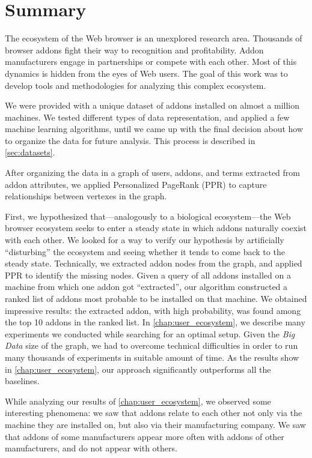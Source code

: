 \documentclass[11pt,oneside]{book}
\begin{document}
\chapter{Summary}
\label{chap:summary}
The ecosystem of the Web browser is an unexplored research area. Thousands of browser addons fight their way to recognition and profitability. Addon manufacturers engage in partnerships or compete with each other. Most of this dynamics is hidden from the eyes of Web users. The goal of this work was to develop tools and methodologies for analyzing this complex ecosystem.

We were provided with a unique dataset of addons installed on almost a million machines. We tested different types of data representation, and applied a few machine learning algorithms, until we came up with the final decision about how to organize the data for future analysis. This process is described in \autoref{sec:datasets}.

After organizing the data in a graph of users, addons, and terms extracted from addon attributes, we applied Personalized PageRank (PPR) to capture relationships between vertexes in the graph.

First, we hypothesized that---analogously to a biological ecosystem---the Web browser ecosystem seeks to enter a steady state in which addons naturally coexist with each other. We looked for a way to verify our hypothesis by artificially ``disturbing'' the ecosystem and seeing whether it tends to come back to the steady state. Technically, we extracted addon nodes from the graph, and applied PPR to identify the missing nodes. Given a query of all addons installed on a machine from which one addon got ``extracted'', our algorithm constructed a ranked list of addons most probable to be installed on that machine. We obtained impressive results: the extracted addon, with high probability, was found among the top 10 addons in the ranked list. In \autoref{chap:user_ecosystem}, we describe many experiments we conducted while searching for an optimal setup. Given the \emph{Big Data} size of the graph, we had to overcome technical difficulties in order to run many thousands of experiments in suitable amount of time. As the results show in \autoref{chap:user_ecosystem}, our approach significantly outperforms all the baselines.

While analyzing our results of \autoref{chap:user_ecosystem}, we observed some interesting phenomena: we saw that addons relate to each other not only via the machine they are installed on, but also via their manufacturing company. We saw that addons of some manufacturers appear more often with addons of other manufacturers, and do not appear with others.
\end{document}

